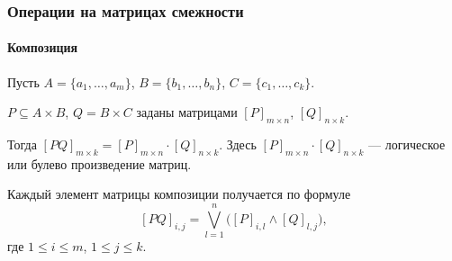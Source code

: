 \begin{frame}
    \frametitle{Операции на матрицах смежности}
    \framesubtitle{Композиция}
    
    Пусть $A=\{a_1,\ldots,a_m\}$, $B=\{b_1,\ldots,b_n\}$, $C=\{c_1,\ldots,c_k\}$.
    
    $P\subseteq A\times B$, $Q=B\times C$ заданы матрицами $[P]_{m\times n}$, $[Q]_{n\times k}$.

    Тогда $[PQ]_{m\times k} = [P]_{m\times n}\cdot [Q]_{n\times k}$. Здесь $[P]_{m\times n}\cdot [Q]_{n\times k}$ --- \alert{логическое} или \alert{булево} произведение матриц.

    Каждый элемент матрицы композиции получается по формуле
    \[
        [PQ]_{i,j}=\bigvee_{l=1}^{n} \big([P]_{i,l}\land [Q]_{l,j}\big),
    \]
    где $1\leq i\leq m$, $1\leq j\leq k$.
\end{frame}

